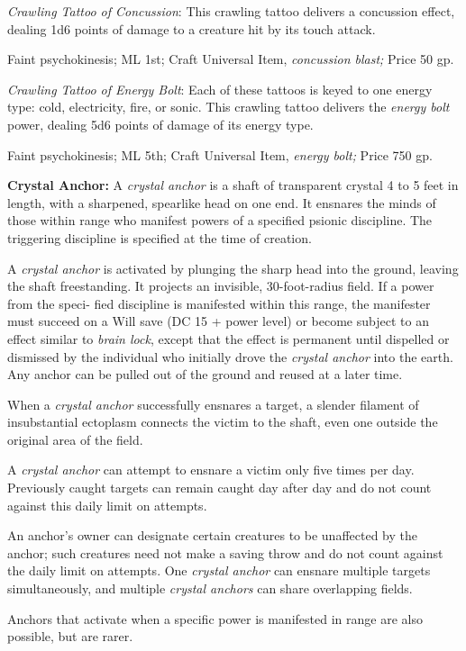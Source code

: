 \documentclass{article}
\begin{document}
\textit{Crawling Tattoo of Concussion}: This crawling tattoo delivers a concussion 
effect, dealing 1d6 points of damage to a creature hit by its touch attack.

Faint psychokinesis; ML 1st; Craft Universal Item, \textit{concussion blast; }Price 
50 gp.

\textit{Crawling Tattoo of Energy Bolt}: Each of these tattoos is keyed to one 
energy type: cold, electricity, fire, or sonic. This crawling tattoo delivers the 
\textit{energy bolt }power, dealing 5d6 points of damage of its energy type.

Faint psychokinesis; ML 5th; Craft Universal Item, \textit{energy bolt; }Price 
750 gp.

\textbf{Crystal Anchor: }A \textit{crystal anchor }is a shaft of transparent crystal 
4 to 5 feet in length, with a sharpened, spearlike head on one end. It ensnares 
the minds of those within range who manifest powers of a specified psionic discipline. 
The triggering discipline is specified at the time of creation.

A \textit{crystal anchor }is activated by plunging the sharp head into the ground, 
leaving the shaft freestanding. It projects an invisible, 30-foot-radius field. 
If a power from the speci- fied discipline is manifested within this range, the 
manifester must succeed on a Will save (DC 15 + power level) or become subject 
to an effect similar to \textit{brain lock}, except that the effect is permanent 
until dispelled or dismissed by the individual who initially drove the \textit{crystal 
anchor }into the earth. Any anchor can be pulled out of the ground and reused at 
a later time.

When a \textit{crystal anchor }successfully ensnares a target, a slender filament 
of insubstantial ectoplasm connects the victim to the shaft, even one outside the 
original area of the field.

A \textit{crystal anchor }can attempt to ensnare a victim only five times per day. 
Previously caught targets can remain caught day after day and do not count against 
this daily limit on attempts.

An anchor's owner can designate certain creatures to be unaffected by the anchor; 
such creatures need not make a saving throw and do not count against the daily 
limit on attempts. One \textit{crystal anchor }can ensnare multiple targets simultaneously, 
and multiple \textit{crystal anchors }can share overlapping fields.

Anchors that activate when a specific power is manifested in range are also possible, 
but are rarer.
\end{document}
